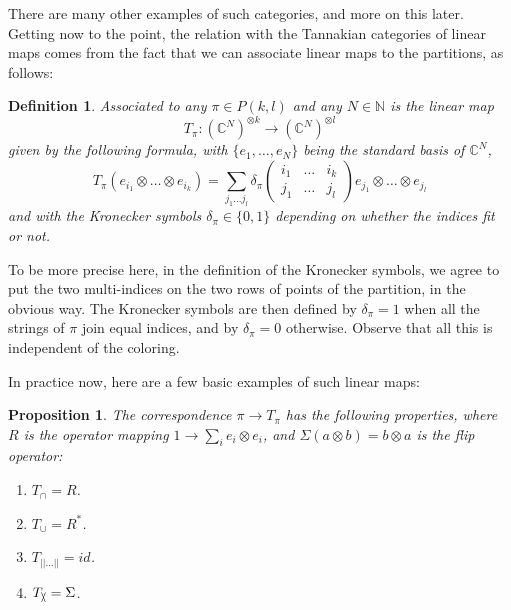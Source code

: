 \documentclass[12pt]{amsbook}
\newtheorem{definition}[theorem]{Definition}
\newtheorem{proposition}[theorem]{Proposition}
\begin{document}
There are many other examples of such categories, and more on this later. Getting now to the point, the relation with the Tannakian categories of linear maps comes from the fact that we can associate linear maps to the partitions, as follows:

\begin{definition}
Associated to any $\pi\in P(k,l)$ and any $N\in\mathbb N$ is the linear map 
$$T_\pi:(\mathbb C^N)^{\otimes k}\to(\mathbb C^N)^{\otimes l}$$
given by the following formula, with $\{e_1,\ldots,e_N\}$ being the standard basis of $\mathbb C^N$,
$$T_\pi(e_{i_1}\otimes\ldots\otimes e_{i_k})=\sum_{j_1\ldots j_l}\delta_\pi\begin{pmatrix}i_1&\ldots&i_k\\ j_1&\ldots&j_l\end{pmatrix}e_{j_1}\otimes\ldots\otimes e_{j_l}$$
and with the Kronecker symbols $\delta_\pi\in\{0,1\}$ depending on whether the indices fit or not. 
\end{definition}


To be more precise here, in the definition of the Kronecker symbols, we agree to put the two multi-indices on the two rows of points of the partition, in the obvious way. The Kronecker symbols are then defined by $\delta_\pi=1$ when all the strings of $\pi$ join equal indices, and by $\delta_\pi=0$ otherwise. Observe that all this is independent of the coloring.

\bigskip

In practice now, here are a few basic examples of such linear maps:


\begin{proposition}
The correspondence $\pi\to T_\pi$ has the following properties, where $R$ is the operator mapping $1\to\sum_ie_i\otimes e_i$, and $\Sigma(a\otimes b)=b\otimes a$ is the flip operator:
\begin{enumerate}
\item $T_\cap=R$.

\item $T_\cup=R^*$.

\item $T_{||\ldots||}=id$.

\item $T_{\slash\hskip-1.5mm\backslash}=\Sigma$.
\end{enumerate}
\end{proposition}
\end{document}
